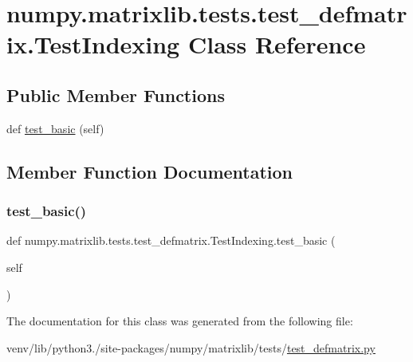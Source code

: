 \hypertarget{classnumpy_1_1matrixlib_1_1tests_1_1test__defmatrix_1_1TestIndexing}{}\section{numpy.\+matrixlib.\+tests.\+test\+\_\+defmatrix.\+Test\+Indexing Class Reference}
\label{classnumpy_1_1matrixlib_1_1tests_1_1test__defmatrix_1_1TestIndexing}
\subsection*{Public Member Functions}
\begin{DoxyCompactItemize}
\item 
def \hyperlink{classnumpy_1_1matrixlib_1_1tests_1_1test__defmatrix_1_1TestIndexing_a94475dceed5f832060cfce5f9e506001}{test\+\_\+basic} (self)
\end{DoxyCompactItemize}


\subsection{Member Function Documentation}
\mbox{\label{classnumpy_1_1matrixlib_1_1tests_1_1test__defmatrix_1_1TestIndexing_a94475dceed5f832060cfce5f9e506001}} 
\subsubsection{\texorpdfstring{test\+\_\+basic()}{test\_basic()}}
{\footnotesize\ttfamily def numpy.\+matrixlib.\+tests.\+test\+\_\+defmatrix.\+Test\+Indexing.\+test\+\_\+basic (\begin{DoxyParamCaption}\item[{}]{self }\end{DoxyParamCaption})}



The documentation for this class was generated from the following file\+:\begin{DoxyCompactItemize}
\item 
venv/lib/python3./site-\/packages/numpy/matrixlib/tests/\hyperlink{test__defmatrix_8py}{test\+\_\+defmatrix.\+py}\end{DoxyCompactItemize}
